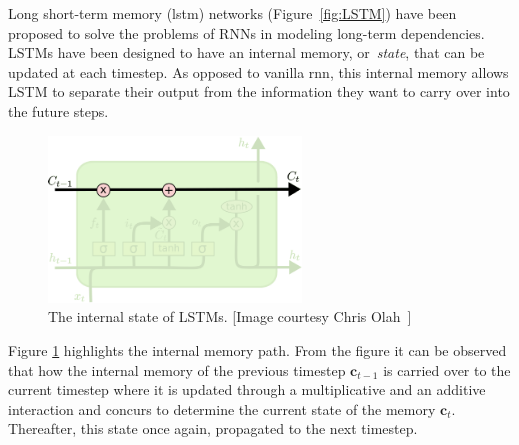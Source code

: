 Long short-term memory (\gls{lstm}) networks (Figure~\ref{fig:LSTM}) have been proposed to solve the problems of RNNs in modeling long-term dependencies. LSTMs have been designed to have an internal memory, or~\emph{state}, that can be updated at each timestep. As opposed to vanilla \gls{rnn}, this internal memory allows LSTM to separate their output from the information they want to carry over into the future steps.

\begin{figure}[t]
	\centering
	\includegraphics[width=0.6\textwidth]{figures/LSTM_state.pdf}
	\caption[The internal state of LSTMs]
	{The internal state of LSTMs. [Image courtesy Chris Olah~\cite{colah_15}]\label{fig:LSTM_state}}
\end{figure}

Figure \ref{fig:LSTM_state} highlights the internal memory path. From the figure it can be observed that how the internal memory of the previous timestep $\mathbf{c}_{t-1}$ is carried over to the current timestep where it is updated through a multiplicative and an additive interaction and concurs to determine the current state of the memory $\mathbf{c}_t$. Thereafter, this state once again, propagated to the next timestep.


